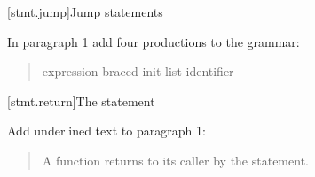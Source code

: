 %
%
%
%
%
%
%

\setcounter{section}{5}
[stmt.jump]{Jump statements}%

In paragraph 1 add four productions to the grammar:

\begin{quote}
\begin{bnf}
	\br
	\br
	\br
	 expression\opt \terminal{;}\br
	 braced-init-list \terminal{;}\br
	\br
  \br
  \br
	\br
	 identifier \terminal{;}
\end{bnf}
\end{quote}

\setcounter{subsection}{2}
[stmt.return]{The  statement}%
%
%

Add underlined text to paragraph 1:

\begin{quote}
\pnum
A function returns to its caller by the  statement.
\end{quote}

